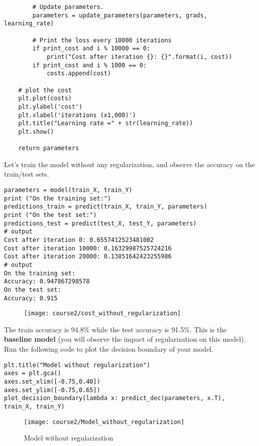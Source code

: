 \begin{verbatim}
        # Update parameters.
        parameters = update_parameters(parameters, grads, learning_rate)
        
        # Print the loss every 10000 iterations
        if print_cost and i % 10000 == 0:
            print("Cost after iteration {}: {}".format(i, cost))
        if print_cost and i % 1000 == 0:
            costs.append(cost)
    
    # plot the cost
    plt.plot(costs)
    plt.ylabel('cost')
    plt.xlabel('iterations (x1,000)')
    plt.title("Learning rate =" + str(learning_rate))
    plt.show()
    
    return parameters
\end{verbatim}

Let's train the model without any regularization, and observe the accuracy on the train/test sets.
\begin{verbatim}
parameters = model(train_X, train_Y)
print ("On the training set:")
predictions_train = predict(train_X, train_Y, parameters)
print ("On the test set:")
predictions_test = predict(test_X, test_Y, parameters)
# output
Cost after iteration 0: 0.6557412523481002
Cost after iteration 10000: 0.16329987525724216
Cost after iteration 20000: 0.13851642423255986
# output
On the training set:
Accuracy: 0.947867298578
On the test set:
Accuracy: 0.915
\end{verbatim}

\vspace{-0.7cm}
\begin{figure}[h]
\begin{center}
\texttt{[image: course2/cost\_without\_regularization]}
\end{center}
\end{figure}
\vspace{-0.7cm}
The train accuracy is 94.8\% while the test accuracy is 91.5\%. This is the {\textbf {baseline model}} (you will observe the impact of regularization on this model). Run the following code to plot the decision boundary of your model.

\begin{verbatim}
plt.title("Model without regularization")
axes = plt.gca()
axes.set_xlim([-0.75,0.40])
axes.set_ylim([-0.75,0.65])
plot_decision_boundary(lambda x: predict_dec(parameters, x.T), train_X, train_Y)
\end{verbatim}
\vspace{-0.7cm}
\begin{figure}[h]
\begin{center}
\texttt{[image: course2/Model\_without\_regularization]}
\caption{Model without regularization}
\end{center}
\end{figure}
\vspace{-0.7cm}

